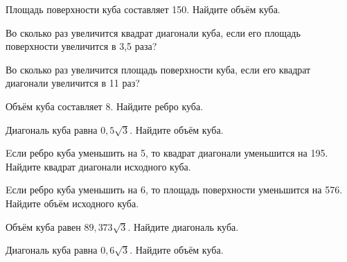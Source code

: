 \begin{taskBN}{28}
Площадь поверхности куба составляет 150. Найдите объём куба.
\end{taskBN}

\begin{taskBN}{29}
Во сколько раз увеличится квадрат диагонали куба, если его площадь поверхности увеличится в 3,5 раза?
\end{taskBN}

\begin{taskBN}{30}
Во сколько раз увеличится площадь поверхности куба, если его квадрат диагонали увеличится в 11 раз?
\end{taskBN}

\begin{taskBN}{31}
Объём куба составляет 8. Найдите ребро куба.
\end{taskBN}

\begin{taskBN}{32}
Диагональ куба равна $0,5\sqrt{3}$. Найдите объём куба.
\end{taskBN}

\begin{taskBN}{33}
Eсли ребро куба уменьшить на 5, то квадрат диагонали уменьшится на 195. Найдите квадрат диагонали исходного куба.
\end{taskBN}

\begin{taskBN}{34}
Eсли ребро куба уменьшить на 6, то площадь поверхности уменьшится на 576. Найдите объём исходного куба.
\end{taskBN}

\begin{taskBN}{35}
Объём куба равен $89,373\sqrt{3}$. Найдите диагональ куба.
\end{taskBN}

\begin{taskBN}{36}
Диагональ куба равна $0,6\sqrt{3}$. Найдите объём куба.
\end{taskBN}

